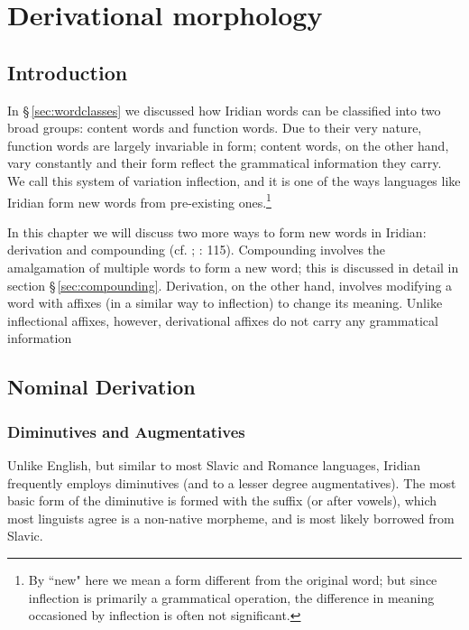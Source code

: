 \chapter{Derivational morphology}

\section{Introduction}

In \S\,\ref{sec:wordclasses} we discussed how Iridian words can be classified into two broad groups: content words and function words. Due to their very nature, function words are largely invariable in form; content words, on the other hand, vary constantly and their form reflect the grammatical information they carry. We call this system of variation {\sc inflection}, and it is one of the ways languages like Iridian form new words from pre-existing ones.\footnote{By ``new" here we mean a form different from the original word; but since inflection is primarily a grammatical operation, the difference in meaning occasioned by inflection is often not significant.}

In this chapter we will discuss two more ways to form new words in Iridian: {\sc derivation} and {\sc compounding} (cf. \cite{booij2005}; \cite{velupillai2012}: 115). Compounding involves the amalgamation of multiple words to form a new word; this is discussed in detail in section \S\,\ref{sec:compounding}. Derivation, on the other hand, involves modifying a word with affixes (in a similar way to inflection) to change its meaning. Unlike inflectional affixes, however, derivational affixes do not carry any grammatical information

\section{Nominal Derivation}
\subsection{Diminutives and Augmentatives}\label{sec:diminutive}

Unlike English, but similar to most Slavic and Romance languages, Iridian frequently employs {\sc diminutives} (and to a lesser degree {\sc augmentatives}). The most basic form of the diminutive is formed with the suffix  (or  after vowels), which most linguists agree is a non-native morpheme, and is most likely borrowed from Slavic.

